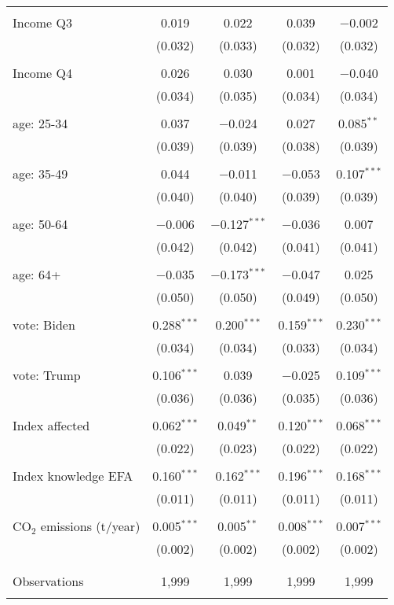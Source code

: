 \begin{tabular}{@{\extracolsep{5pt}}lcccc}
  & & & & \\ 
 Income Q3 & 0.019 & 0.022 & 0.039 & $-$0.002 \\ 
  & (0.032) & (0.033) & (0.032) & (0.032) \\ 
  & & & & \\ 
 Income Q4 & 0.026 & 0.030 & 0.001 & $-$0.040 \\ 
  & (0.034) & (0.035) & (0.034) & (0.034) \\ 
  & & & & \\ 
 age: 25-34 & 0.037 & $-$0.024 & 0.027 & 0.085$^{**}$ \\ 
  & (0.039) & (0.039) & (0.038) & (0.039) \\ 
  & & & & \\ 
 age: 35-49 & 0.044 & $-$0.011 & $-$0.053 & 0.107$^{***}$ \\ 
  & (0.040) & (0.040) & (0.039) & (0.039) \\ 
  & & & & \\ 
 age: 50-64 & $-$0.006 & $-$0.127$^{***}$ & $-$0.036 & 0.007 \\ 
  & (0.042) & (0.042) & (0.041) & (0.041) \\ 
  & & & & \\ 
 age: 64+ & $-$0.035 & $-$0.173$^{***}$ & $-$0.047 & 0.025 \\ 
  & (0.050) & (0.050) & (0.049) & (0.050) \\ 
  & & & & \\ 
 vote: Biden & 0.288$^{***}$ & 0.200$^{***}$ & 0.159$^{***}$ & 0.230$^{***}$ \\ 
  & (0.034) & (0.034) & (0.033) & (0.034) \\ 
  & & & & \\ 
 vote: Trump & 0.106$^{***}$ & 0.039 & $-$0.025 & 0.109$^{***}$ \\ 
  & (0.036) & (0.036) & (0.035) & (0.036) \\ 
  & & & & \\ 
 Index affected & 0.062$^{***}$ & 0.049$^{**}$ & 0.120$^{***}$ & 0.068$^{***}$ \\ 
  & (0.022) & (0.023) & (0.022) & (0.022) \\ 
  & & & & \\ 
 Index knowledge EFA & 0.160$^{***}$ & 0.162$^{***}$ & 0.196$^{***}$ & 0.168$^{***}$ \\ 
  & (0.011) & (0.011) & (0.011) & (0.011) \\ 
  & & & & \\ 
 CO$_{2}$ emissions (t/year) & 0.005$^{***}$ & 0.005$^{**}$ & 0.008$^{***}$ & 0.007$^{***}$ \\ 
  & (0.002) & (0.002) & (0.002) & (0.002) \\ 
  & & & & \\ 
\hline \\[-1.8ex] 

Observations & 1,999 & 1,999 & 1,999 & 1,999 \\ 
\hline 
\hline \\[-1.8ex] 
\end{tabular} 